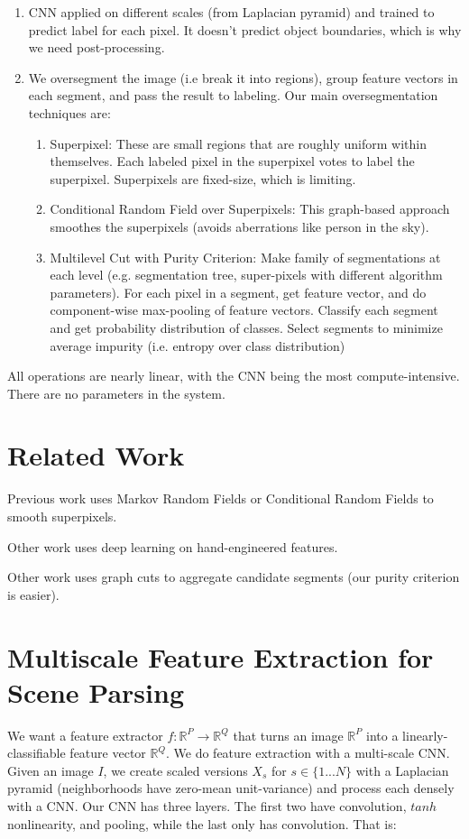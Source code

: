 \documentclass[a4paper]{article}
\begin{document}
\begin{enumerate}
  \item CNN applied on different scales (from Laplacian pyramid) and trained
  to predict label for each pixel. It doesn't predict object boundaries,
  which is why we need post-processing.
  \item We oversegment the image (i.e break it into regions),
  group feature vectors in each segment, and pass the result to labeling. Our
  main oversegmentation techniques are:
  \begin{enumerate}
    \item Superpixel: These are small regions that are roughly uniform within
    themselves. Each labeled pixel in the superpixel votes to label the
    superpixel. Superpixels are fixed-size, which is limiting.
    \item Conditional Random Field over Superpixels: This graph-based approach
    smoothes the superpixels (avoids aberrations like person in the sky).
    \item Multilevel Cut with Purity Criterion: Make family of segmentations at
    each level (e.g. segmentation tree, super-pixels with different algorithm
    parameters). For each pixel in a segment, get feature vector, and do
    component-wise max-pooling of feature vectors. Classify each segment and
    get probability distribution of classes. Select segments to minimize
    average impurity (i.e. entropy over class distribution)
  \end{enumerate}
\end{enumerate}

All operations are nearly linear, with the CNN being the most compute-intensive.
There are no parameters in the system.

\section{Related Work}
Previous work uses Markov Random Fields or Conditional Random Fields to smooth
superpixels.

Other work uses deep learning on hand-engineered features.

Other work uses graph cuts to aggregate candidate segments (our purity
criterion is easier).

\section{Multiscale Feature Extraction for Scene Parsing}
We want a feature extractor $f: \mathbb{R}^P \rightarrow \mathbb{R}^Q$ that
turns an image $\mathbb{R}^P$ into a linearly-classifiable feature vector
$\mathbb{R}^Q$. We do feature extraction with a multi-scale CNN. Given an
image $I$, we create scaled versions $X_s$ for $s \in \{1...N\}$ with a
Laplacian pyramid (neighborhoods have zero-mean unit-variance) and process each
densely with a CNN. Our CNN has three layers. The first two have convolution,
$tanh$ nonlinearity, and pooling, while the last only has convolution. That is:
\end{document}

